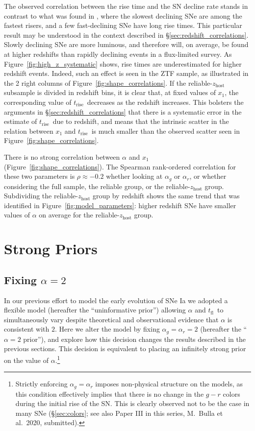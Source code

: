 \documentclass[twocolumn]{./aastex63}
\newcommand{\tfl}{$t_\mathrm{fl}$}
\newcommand{\trise}{$t_\mathrm{rise}$}
\begin{document}
The observed correlation between the rise time and the SN decline rate stands
in contrast to what was found in \citet{Hayden10}, where the slowest declining
SNe are among the fastest risers, and a few fast-declining SNe have long rise
times. This particular result may be understood in the context described in
\S\ref{sec:redshift_correlations}. Slowly declining SNe are more luminous, and
therefore will, on average, be found at higher redshifts than rapidly
declining events in a flux-limited survey. As
Figure~\ref{fig:high_z_systematic} shows, rise times are underestimated for
higher redshift events. Indeed, such an effect is seen in the ZTF sample, as
illustrated in the 2 right columns of Figure~\ref{fig:shape_correlations}. If
the reliable-$z_\mathrm{host}$ subsample is divided in redshift bins, it is
clear that, at fixed values of $x_1$, the corresponding value of \trise\
decreases as the redshift increases. This bolsters the arguments in
\S\ref{sec:redshift_correlations} that there is a systematic error in the
estimate of \trise\ due to redshift, and means that the intrinsic scatter in
the relation between $x_1$ and \trise\ is much smaller than the observed
scatter seen in Figure~\ref{fig:shape_correlations}.

There is no strong correlation between $\alpha$ and $x_1$
(Figure~\ref{fig:shape_correlations}). The Spearman rank-ordered correlation
for these two parameters is $\rho \approx -0.2$ whether looking at $\alpha_g$
or $\alpha_r$, or whether considering the full sample, the reliable group, or
the reliable-$z_\mathrm{host}$ group. Subdividing the
reliable-$z_\mathrm{host}$ group by redshift shows the same trend that was
identified in Figure~\ref{fig:model_parameters}: higher redshift SNe have
smaller values of $\alpha$ on average for the reliable-$z_\mathrm{host}$ group.

\section{Strong Priors}\label{sec:strong_priors}

\subsection{Fixing $\alpha = 2$}

In our previous effort to model the early evolution of SNe Ia we adopted a
flexible model (hereafter the ``uninformative prior'') allowing $\alpha$ and
\tfl\ to simultaneously vary despite theoretical \citep{Arnett82,Riess99a} and
observational \citep{Conley06,Hayden10,Ganeshalingam11} evidence that $\alpha$
is consistent with $2$. Here we alter the model by fixing $\alpha_g = \alpha_r
= 2$ (hereafter the ``$\alpha = 2$ prior''), and explore how this decision
changes the results described in the previous sections. This decision is
equivalent to placing an infinitely strong prior on the value of
$\alpha$.\footnote{Strictly enforcing $\alpha_g = \alpha_r$ imposes
non-physical structure on the models, as this condition effectively implies
that there is no change in the $g - r$ colors during the initial rise of the
SN. This is clearly observed not to be the case in many SNe
(\S\ref{sec:colors}; see also Paper III in this series, M.~Bulla et al.\ 2020,
submitted).}
\end{document}

